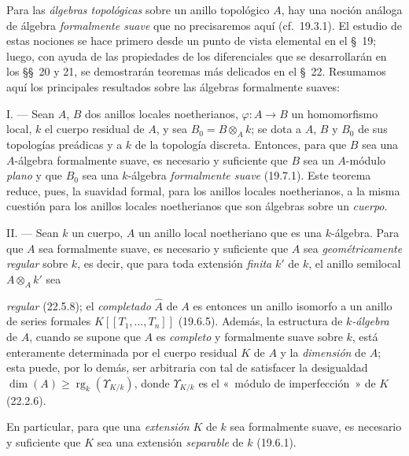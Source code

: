 \begin{env}[19.0.2]
\label{0.19.0.2-fr}
Para las \emph{álgebras topológicas} sobre un anillo topológico $A$, hay una
noción análoga de álgebra \emph{formalmente suave} que no precisaremos
aquí (cf.~19.3.1). El estudio de estas nociones se hace primero desde un punto de vista
elemental en el §~19; luego, con ayuda de las propiedades de los diferenciales que
se desarrollarán en los §§~20 y 21, se demostrarán teoremas más delicados
en el §~22. Resumamos aquí los principales resultados sobre las álgebras formalmente
suaves:

\medskip\noindent I. --- Sean $A$, $B$ dos anillos locales
noetherianos, $\varphi:A\to B$ un homomorfismo local, $k$ el cuerpo residual de
$A$, y sea $B_0=B\otimes_A k$; se dota a $A$, $B$ y $B_0$ de sus
topologías preádicas y a $k$ de la topología discreta. Entonces, para que $B$ sea
una $A$-álgebra formalmente suave, es necesario y suficiente que $B$ sea un
$A$-módulo \emph{plano} y que $B_0$ sea una $k$-álgebra \emph{formalmente
suave} (19.7.1). Este teorema reduce, pues, la suavidad formal, para los anillos
locales noetherianos, a la misma cuestión para los anillos locales noetherianos que
son álgebras sobre un \emph{cuerpo}.

\medskip\noindent II. --- Sean $k$ un cuerpo, $A$ un anillo local
noetheriano que es una $k$-álgebra. Para que $A$ sea formalmente suave, es
necesario y suficiente que $A$ sea \emph{geométricamente regular} sobre $k$,
es decir, que para toda extensión \emph{finita} $k'$ de $k$, el anillo
semilocal $A\otimes_A k'$ sea


\noindent \emph{regular} (22.5.8); el \emph{completado} $\widehat A$ de $A$ es entonces
un anillo isomorfo a un anillo de series formales
$K[[T_1,\ldots,T_n]]$ (19.6.5). Además, la estructura de \emph{$k$-álgebra} de $A$,
cuando se supone que $A$ es \emph{completo} y formalmente suave sobre $k$, está
enteramente determinada por el cuerpo residual $K$ de $A$ y la \emph{dimensión}
de $A$; esta puede, por lo demás, ser arbitraria con tal de satisfacer la
desigualdad
$\dim(A)\geq \operatorname{rg}_k(\Upsilon_{K/k})$,
donde $\Upsilon_{K/k}$ es el «~módulo de imperfección~» de $K$ (22.2.6).

En particular, para que una \emph{extensión} $K$ de $k$ sea formalmente
suave, es necesario y suficiente que $K$ sea una extensión \emph{separable} de $k$
(19.6.1).


\end{env}
